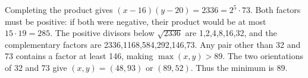 Completing the product gives $(x-16)(y-20)=2336=2^5\cdot73$. Both factors must be positive: if both were negative, their product would be at most $15\cdot19=285$. The positive divisors below $\sqrt{2336}$ are 1,2,4,8,16,32, and the complementary factors are 2336,1168,584,292,146,73. Any pair other than 32 and 73 contains a factor at least 146, making $\max(x,y)>89$. The two orientations of 32 and 73 give $(x,y)=(48,93)$ or $(89,52)$. Thus the minimum is $\boxed{89}$.
